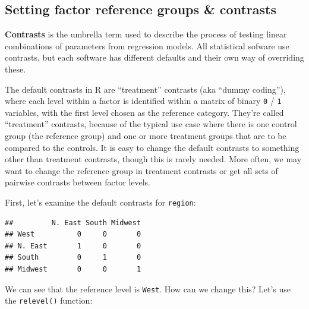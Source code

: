 \documentclass[
]{book}
\newenvironment{Shaded}{\begin{snugshade}}{\end{snugshade}}
\newcommand{\CommentTok}[1]{\textcolor[rgb]{0.56,0.35,0.01}{\textit{#1}}}
\newcommand{\DataTypeTok}[1]{\textcolor[rgb]{0.13,0.29,0.53}{#1}}
\newcommand{\KeywordTok}[1]{\textcolor[rgb]{0.13,0.29,0.53}{\textbf{#1}}}
\newcommand{\NormalTok}[1]{#1}
\newcommand{\OperatorTok}[1]{\textcolor[rgb]{0.81,0.36,0.00}{\textbf{#1}}}
\newcommand{\StringTok}[1]{\textcolor[rgb]{0.31,0.60,0.02}{#1}}
\begin{document}
\hypertarget{setting-factor-reference-groups-contrasts}{%
\subsection{Setting factor reference groups \& contrasts}\label{setting-factor-reference-groups-contrasts}}

\textbf{Contrasts} is the umbrella term used to describe the process of testing linear combinations of parameters from regression models. All statistical sofware use contrasts, but each software has different defaults and their own way of overriding these.

The default contrasts in R are ``treatment'' contrasts (aka ``dummy coding''), where each level within a factor is identified within a matrix of binary \texttt{0} / \texttt{1} variables, with the first level chosen as the reference category. They're called ``treatment'' contrasts, because of the typical use case where there is one control group (the reference group) and one or more treatment groups that are to be compared to the controls. It is easy to change the default contrasts to something other than treatment contrasts, though this is rarely needed. More often, we may want to change the reference group in treatment contrasts or get all sets of pairwise contrasts between factor levels.

First, let's examine the default contrasts for \texttt{region}:

\begin{Shaded}
\end{Shaded}

\begin{verbatim}
##         N. East South Midwest
## West          0     0       0
## N. East       1     0       0
## South         0     1       0
## Midwest       0     0       1
\end{verbatim}

We can see that the reference level is \texttt{West}. How can we change this? Let's use the \texttt{relevel()} function:

\begin{Shaded}
\end{Shaded}
\end{document}
